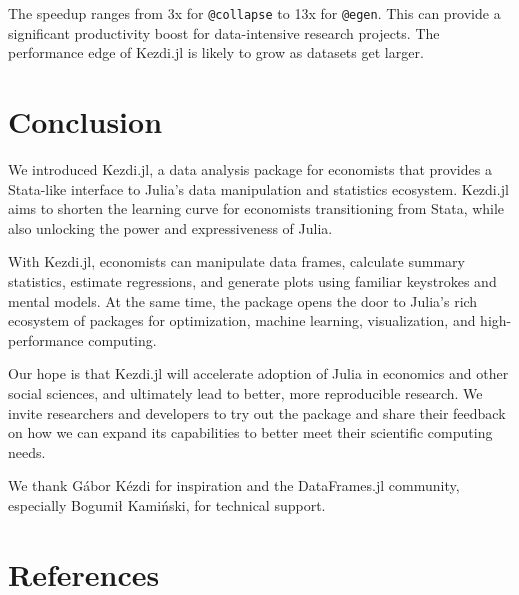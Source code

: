 \documentclass{juliacon}
\begin{document}
The speedup ranges from 3x for \texttt{@collapse} to 13x for \texttt{@egen}. This can provide a significant productivity boost for data-intensive research projects. The performance edge of Kezdi.jl is likely to grow as datasets get larger.

\section{Conclusion}

We introduced Kezdi.jl, a data analysis package for economists that provides a Stata-like interface to Julia's data manipulation and statistics ecosystem. Kezdi.jl aims to shorten the learning curve for economists transitioning from Stata, while also unlocking the power and expressiveness of Julia.

With Kezdi.jl, economists can manipulate data frames, calculate summary statistics, estimate regressions, and generate plots using familiar keystrokes and mental models. At the same time, the package opens the door to Julia's rich ecosystem of packages for optimization, machine learning, visualization, and high-performance computing.

Our hope is that Kezdi.jl will accelerate adoption of Julia in economics and other social sciences, and ultimately lead to better, more reproducible research. We invite researchers and developers to try out the package and share their feedback on how we can expand its capabilities to better meet their scientific computing needs.

\backmatter


We thank Gábor Kézdi for inspiration and the DataFrames.jl community, especially Bogumił Kamiński, for technical support.

\section*{References}
\begingroup
\setlength{\parindent}{0pt}
\setlength{\parskip}{2pt}
\def\small{\small}




\endgroup
\end{document}
